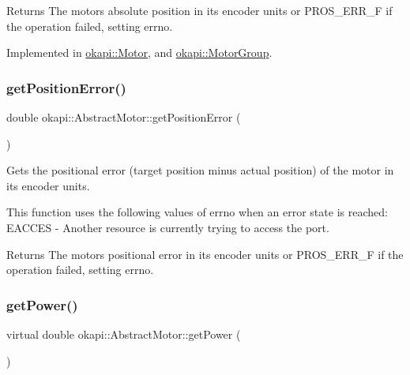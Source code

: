 \begin{DoxyReturn}{Returns}
The motor\textquotesingle{}s absolute position in its encoder units or P\+R\+O\+S\+\_\+\+E\+R\+R\+\_\+F if the operation failed, setting errno. 
\end{DoxyReturn}


Implemented in \mbox{\hyperlink{classokapi_1_1Motor_a4592f8a1cce4474f85ceabd3d7e2fe0b}{okapi\+::\+Motor}}, and \mbox{\hyperlink{classokapi_1_1MotorGroup_a6bf3c5a2f5caf0e5b02e8dcf2e8130d9}{okapi\+::\+Motor\+Group}}.

\mbox{\label{classokapi_1_1AbstractMotor_aaef41096c3a80f319f8fd42321726310}} 
\subsubsection{\texorpdfstring{getPositionError()}{getPositionError()}}
{\footnotesize\ttfamily double okapi\+::\+Abstract\+Motor\+::get\+Position\+Error (\begin{DoxyParamCaption}{ }\end{DoxyParamCaption})}

Gets the positional error (target position minus actual position) of the motor in its encoder units.

This function uses the following values of errno when an error state is reached\+: E\+A\+C\+C\+ES -\/ Another resource is currently trying to access the port.

\begin{DoxyReturn}{Returns}
The motor\textquotesingle{}s positional error in its encoder units or P\+R\+O\+S\+\_\+\+E\+R\+R\+\_\+F if the operation failed, setting errno. 
\end{DoxyReturn}
\mbox{\label{classokapi_1_1AbstractMotor_aed423ac40cec85c5880f7954b6d810fe}} 
\subsubsection{\texorpdfstring{getPower()}{getPower()}}
{\footnotesize\ttfamily virtual double okapi\+::\+Abstract\+Motor\+::get\+Power (\begin{DoxyParamCaption}{ }\end{DoxyParamCaption})\hspace{0.3cm}{\ttfamily [pure virtual]}}

